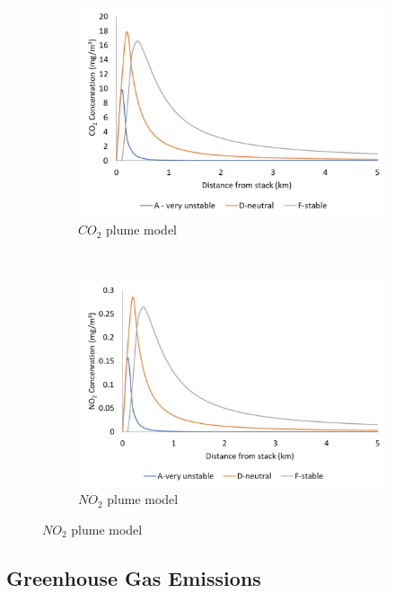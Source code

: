 \begin{figure}[t!]
    \centering
    \begin{subfigure}[t]{0.5\textwidth}
        \centering
        \includegraphics[width=\linewidth]{figures/CO2plume.jpg}
        \caption{$CO_2$ plume model}
    \end{subfigure}%
    ~ 
    \begin{subfigure}[t]{0.5\textwidth}
        \centering
        \includegraphics[width=\linewidth]{figures/NO2plume.jpg}
        \caption{$NO_2$ plume model}
    \end{subfigure}
\end{figure}


\subsection{Greenhouse Gas Emissions}

